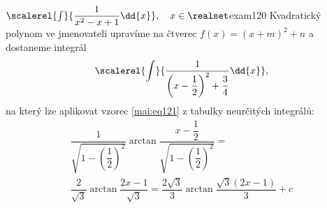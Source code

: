 \begin{mathexam}{\(\scalerel{\int}{\dfrac{1}{x^2 - x + 1}\dd{x}},\quad x\in\realset\)}{exam120}
  Kvadratický polynom ve jmenovateli upravíme na čtverec \(f(x) = (x + m)^2 + n\) a dostaneme
  integrál\[\scalerel{\int}{\dfrac{1}{\left(x-\dfrac{1}{2}\right)^2+\dfrac{3}{4}}\dd{x}},\] na který
  lze aplikovat vzorec \ref{mai:eq121} z tabulky neurčitých integrálů: 
  \begin{multline*}
    \dfrac{1}{\sqrt{1-\left(\dfrac{1}{2}\right)^2}}\arctan
    \dfrac{x-\dfrac{1}{2}}{\sqrt{1-\left(\dfrac{1}{2}\right)^2}} = \\
    \dfrac{2}{\sqrt{3}}\arctan\dfrac{2x-1}{\sqrt{3}}  =
    \dfrac{2\sqrt{3}}{3}\arctan\dfrac{\sqrt{3}(2x-1)}{3} + c
  \end{multline*}
\end{mathexam}